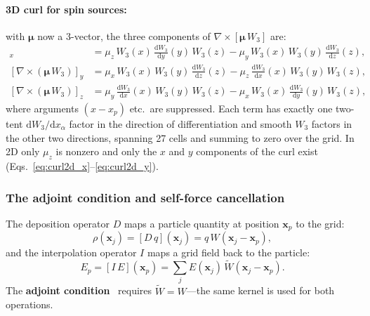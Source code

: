 \documentclass[11pt,a4paper]{article}
\newcommand{\vv}[1]{\mathbf{#1}}
\newcommand{\dd}{\mathrm{d}}
\begin{document}
\paragraph{3D curl for spin sources:} with $\boldsymbol{\mu}$ now a 3-vector, the three components of $\nabla\times[\boldsymbol{\mu}\,W_3]$ are:
\begin{align}
  [\nabla\times(\boldsymbol{\mu}\,W_3)]_x &= \mu_z\,W_3(x)\,\tfrac{\dd W_3}{\dd y}(y)\,W_3(z)
                                           - \mu_y\,W_3(x)\,W_3(y)\,\tfrac{\dd W_3}{\dd z}(z), \\
  [\nabla\times(\boldsymbol{\mu}\,W_3)]_y &= \mu_x\,W_3(x)\,W_3(y)\,\tfrac{\dd W_3}{\dd z}(z)
                                           - \mu_z\,\tfrac{\dd W_3}{\dd x}(x)\,W_3(y)\,W_3(z), \\
  [\nabla\times(\boldsymbol{\mu}\,W_3)]_z &= \mu_y\,\tfrac{\dd W_3}{\dd x}(x)\,W_3(y)\,W_3(z)
                                           - \mu_x\,W_3(x)\,\tfrac{\dd W_3}{\dd y}(y)\,W_3(z),
\end{align}
where arguments $(x-x_p)$ etc.\ are suppressed.  Each term has exactly one two-tent $\dd W_3/\dd x_\alpha$ factor in the direction of differentiation and smooth $W_3$ factors in the other two directions, spanning 27 cells and summing to zero over the grid.  In 2D only $\mu_z$ is nonzero and only the $x$ and $y$ components of the curl exist (Eqs.~\ref{eq:curl2d_x}--\ref{eq:curl2d_y}).

\subsubsection*{The adjoint condition and self-force cancellation}

The deposition operator $D$ maps a particle quantity at position $\vv{x}_p$ to the grid:
\begin{equation}
  \rho(\vv{x}_j) = [D\,q](\vv{x}_j) = q\,W(\vv{x}_j - \vv{x}_p),
\end{equation}
and the interpolation operator $I$ maps a grid field back to the particle:
\begin{equation}
  E_p = [I\,E](\vv{x}_p) = \sum_j E(\vv{x}_j)\,\tilde{W}(\vv{x}_j - \vv{x}_p).
\end{equation}
The \textbf{adjoint condition}~\cite{HockneyEastwood1988} requires $\tilde{W} = W$---the same kernel is used for both operations.
\end{document}
